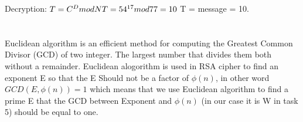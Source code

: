 \documentclass{article}
\begin{document}
            Decryption:\newline
        \begin{math}
            T = C ^ D mod N \newline 
            T = 54^{17} mod 77 = 10
        \end{math}\newline
        T = message = 10. 
    \section{}
    Euclidean algorithm is an efficient method for computing the Greatest Common Divisor (GCD) of two integer. The largest number that divides them both without a remainder.\newline
    Euclidean alogorithm is used in RSA cipher to find an exponent E so that the E Should not be a factor of $\phi(n)$, in other word $GCD(E,\phi(n)) = 1$ 
    which means that we use Euclidean algorithm to find a prime E that the GCD between Exponent and $\phi(n)$ (in our case it is W in task 5) should be equal to one.
    \section{}
        \newpage
        \printbibliography
\end{document}

